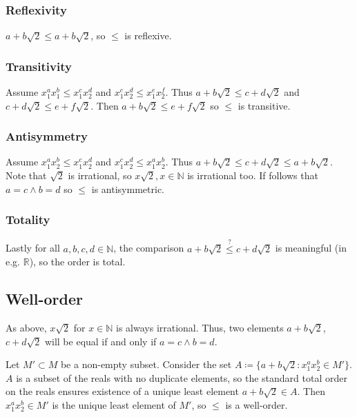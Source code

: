 \documentclass[a4paper]{scrreprt}
\begin{document}
\subsubsection{Reflexivity}

$a + b \sqrt{2} \leq a + b \sqrt{2}$, so $\leq$ is reflexive.

\subsubsection{Transitivity}

Assume $x_1^a x_1^b \leq x_1^c x_2^d$ and $x_1^c x_2^d \leq x_1^e x_2^f$. Thus
$a + b \sqrt{2} \leq c + d \sqrt{2}$ and $c + d \sqrt{2} \leq e + f \sqrt{2}$.
Then $a + b \sqrt{2} \leq e + f \sqrt{2}$ so $\leq$ is transitive.

\subsubsection{Antisymmetry}

Assume $x_1^a x_2^b \leq x_1^c x_2^d$ and $x_1^c x_2^d \leq x_1^a x_2^b$. Thus
$a + b \sqrt{2} \leq c + d \sqrt{2} \leq a + b \sqrt{2}$. Note that $\sqrt{2}$
is irrational, so $x \sqrt{2}, x \in \mathbb{N}$ is irrational too. If follows
that $a = c \land b = d$ so $\leq$ is antisymmetric.

\subsubsection{Totality}

Lastly for all $a, b, c, d \in \mathbb{N}$, the comparison $a + b \sqrt{2}
\overset{?}{\leq} c + d \sqrt{2}$ is meaningful (in e.g. $\mathbb{R}$), so the
order is total.

\subsection{Well-order}

As above, $x \sqrt{2}$ for $x \in \mathbb{N}$ is always irrational. Thus, two
elements $a + b \sqrt{2}$, $c + d \sqrt{2}$ will be equal if and only if $a = c
\land b = d$.

Let $M' \subset M$ be a non-empty subset. Consider the set $A \coloneqq \{a + b
\sqrt{2} : x_1^a x_2^b \in M'\}$. $A$ is a subset of the reals with no
duplicate elements, so the standard total order on the reals ensures existence
of a unique least element $a + b \sqrt{2} \in A$. Then $x_1^a x_2^b \in M'$
is the unique least element of $M'$, so $\leq$ is a well-order.
\end{document}
